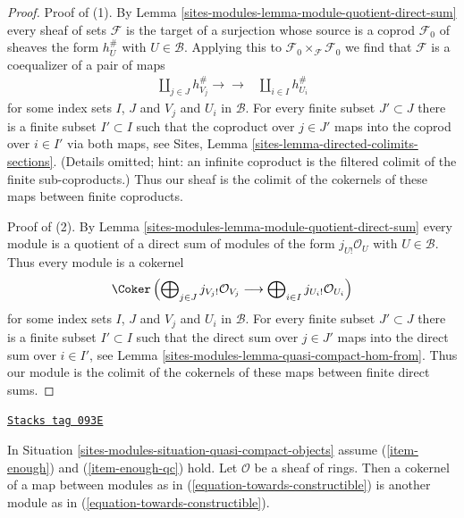 \begin{proof}
Proof of (1). By Lemma \ref{sites-modules-lemma-module-quotient-direct-sum}
every sheaf of sets $\mathcal{F}$ is the target of a surjection
whose source is a coprod $\mathcal{F}_0$
of sheaves the form $h_{U}^\#$ with $U \in \mathcal{B}$.
Applying this to $\mathcal{F}_0 \times_\mathcal{F} \mathcal{F}_0$
we find that $\mathcal{F}$ is a coequalizer of a pair of maps
$$
\begin{array}{cc}\coprod\nolimits_{j \in J} h_{V_j}^\#
\longrightarrow\longrightarrow & \coprod\nolimits_{i \in I} h_{U_i}^\#\end{array}
$$
for some index sets $I$, $J$ and $V_j$ and $U_i$ in $\mathcal{B}$.
For every finite subset $J' \subset J$ there is a finite subset
$I' \subset I$ such that the coproduct over $j \in J'$ maps into
the coprod over $i \in I'$ via both maps, see
Sites, Lemma \ref{sites-lemma-directed-colimits-sections}.
(Details omitted; hint: an infinite coproduct is the filtered colimit
of the finite sub-coproducts.)
Thus our sheaf is the colimit of the cokernels of these maps
between finite coproducts.

\medskip\noindent
Proof of (2).
By Lemma \ref{sites-modules-lemma-module-quotient-direct-sum}
every module is a quotient of a direct sum of modules of the form
$j_{U!}\mathcal{O}_U$ with $U \in \mathcal{B}$. Thus every module
is a cokernel
$$
\Coker\left(
\bigoplus\nolimits_{j \in J} j_{V_j!}\mathcal{O}_{V_j}
\longrightarrow
\bigoplus\nolimits_{i \in I} j_{U_i!}\mathcal{O}_{U_i}
\right)
$$
for some index sets $I$, $J$ and $V_j$ and $U_i$ in $\mathcal{B}$.
For every finite subset $J' \subset J$ there is a finite subset
$I' \subset I$ such that the direct sum over $j \in J'$ maps into
the direct sum over $i \in I'$, see
Lemma \ref{sites-modules-lemma-quasi-compact-hom-from}.
Thus our module is the colimit of the cokernels of these maps
between finite direct sums.
\end{proof}

\begin{lemma}
\label{sites-modules-lemma-cokernel-map-towards-constructibles}
\href{https://stacks.math.columbia.edu/tag/093E}{\texttt{Stacks tag 093E}}

In Situation \ref{sites-modules-situation-quasi-compact-objects} assume
(\ref{item-enough}) and (\ref{item-enough-qc}) hold.
Let $\mathcal{O}$ be a sheaf of rings.
Then a cokernel of a map between modules as in
(\ref{equation-towards-constructible}) is another module as
in (\ref{equation-towards-constructible}).
\end{lemma}


